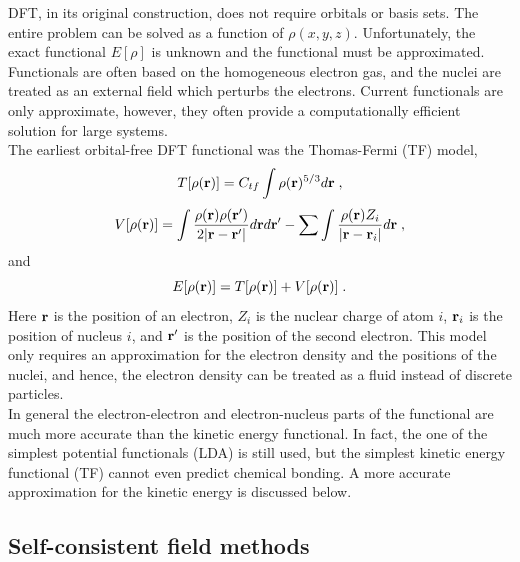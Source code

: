 \documentclass[12pt]{report}
\begin{document}
DFT, in its original construction, does not require orbitals or basis sets.
The entire problem can be solved as a function of $\rho(x,y,z)$.
Unfortunately, the exact functional $E[\rho]$ is unknown and the functional
must be approximated.
Functionals are often based on the homogeneous electron gas, and the nuclei
are treated as an external field which perturbs the electrons.
Current functionals are only approximate, however, they often provide a
computationally efficient solution for large systems. \\

The earliest orbital-free DFT functional was the Thomas-Fermi (TF) model,
\begin{equation}
 T[\rho({\textbf r})] = C_{tf}\int \rho({\textbf r})^{5/3}d{\textbf r} \; ,
\end{equation}
\begin{equation}
 V[\rho({\textbf r})] = \int
 \frac{\rho({\textbf r})\rho({\textbf r}')}{2|{\textbf r}-{\textbf r}'|}
 d{\textbf r}d{\textbf r}'
 -\sum \int \frac{\rho({\textbf r})Z_i}{|{\textbf r}-{\textbf r}_i|}
 d{\textbf r} \; ,
\end{equation}
and
\begin{equation}
 E[\rho({\textbf r})] = T[\rho({\textbf r})]+V[\rho({\textbf r})] \; .
\end{equation}
Here ${\textbf r}$ is the position of an electron, $Z_i$ is the nuclear charge
of atom $i$, ${\textbf r}_i$ is the position of nucleus $i$, and
${\textbf r}'$ is the position of the second electron.
This model only requires an approximation for the electron density and the
positions of the nuclei, and hence, the electron density can be treated as a
fluid instead of discrete particles. \\

In general the electron-electron and electron-nucleus parts of the functional
are much more accurate than the kinetic energy functional.
In fact, the one of the simplest potential functionals (LDA) is still used,
but the simplest kinetic energy functional (TF) cannot even predict chemical
bonding.
A more accurate approximation for the kinetic energy is discussed below.

\subsection{Self-consistent field methods}
\end{document}
